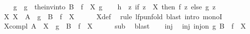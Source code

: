 \begin{isabellebody}
\ \ \isamarkupfalse%
\ g{\isacharprime}{\kern0pt}\ \ {\isachardoublequoteopen}g{\isacharprime}{\kern0pt}\ {\isacharequal}{\kern0pt}\ the{\isacharunderscore}{\kern0pt}inv{\isacharunderscore}{\kern0pt}into\ {\isacharparenleft}{\kern0pt}B\ {\isacharminus}{\kern0pt}\ {\isacharparenleft}{\kern0pt}f\ {\isacharbackquote}{\kern0pt}\ X{\isacharparenright}{\kern0pt}{\isacharparenright}{\kern0pt}\ g{\isachardoublequoteclose}\isanewline
\ \ \isamarkupfalse%
\ {\isacharquery}{\kern0pt}h\ {\isacharequal}{\kern0pt}\ {\isachardoublequoteopen}{\isasymlambda}z{\isachardot}{\kern0pt}\ if\ z\ {\isasymin}\ X\ then\ f\ z\ else\ g{\isacharprime}{\kern0pt}\ z{\isachardoublequoteclose}\isanewline
\isanewline
\ \ \isamarkupfalse%
\ X{\isacharcolon}{\kern0pt}\ {\isachardoublequoteopen}X\ {\isacharequal}{\kern0pt}\ A\ {\isacharminus}{\kern0pt}\ {\isacharparenleft}{\kern0pt}g\ {\isacharbackquote}{\kern0pt}\ {\isacharparenleft}{\kern0pt}B\ {\isacharminus}{\kern0pt}\ {\isacharparenleft}{\kern0pt}f\ {\isacharbackquote}{\kern0pt}\ X{\isacharparenright}{\kern0pt}{\isacharparenright}{\kern0pt}{\isacharparenright}{\kern0pt}{\isachardoublequoteclose}\isanewline
\ \ \ \ \isamarkupfalse%
\ X{\isacharunderscore}{\kern0pt}def\ \isamarkupfalse%
\ {\isacharparenleft}{\kern0pt}rule\ lfp{\isacharunderscore}{\kern0pt}unfold{\isacharparenright}{\kern0pt}\ {\isacharparenleft}{\kern0pt}blast\ intro{\isacharcolon}{\kern0pt}\ monoI{\isacharparenright}{\kern0pt}\isanewline
\ \ \isamarkupfalse%
\ \isamarkupfalse%
\ X{\isacharunderscore}{\kern0pt}compl{\isacharcolon}{\kern0pt}\ {\isachardoublequoteopen}A\ {\isacharminus}{\kern0pt}\ X\ {\isacharequal}{\kern0pt}\ g\ {\isacharbackquote}{\kern0pt}\ {\isacharparenleft}{\kern0pt}B\ {\isacharminus}{\kern0pt}\ {\isacharparenleft}{\kern0pt}f\ {\isacharbackquote}{\kern0pt}\ X{\isacharparenright}{\kern0pt}{\isacharparenright}{\kern0pt}{\isachardoublequoteclose}\isanewline
\ \ \ \ \isamarkupfalse%
\ sub{}\ \isamarkupfalse%
\ blast\isanewline
\isanewline
\ \ \isamarkupfalse%
\ inj{}\ \isamarkupfalse%
\ inj{}{\isacharprime}{\kern0pt}{\isacharcolon}{\kern0pt}\ {\isachardoublequoteopen}inj{\isacharunderscore}{\kern0pt}on\ g\ {\isacharparenleft}{\kern0pt}B\ {\isacharminus}{\kern0pt}\ {\isacharparenleft}{\kern0pt}f\ {\isacharbackquote}{\kern0pt}\ X{\isacharparenright}{\kern0pt}{\isacharparenright}{\kern0pt}{\isachardoublequoteclose}\isanewline

\end{isabellebody}
